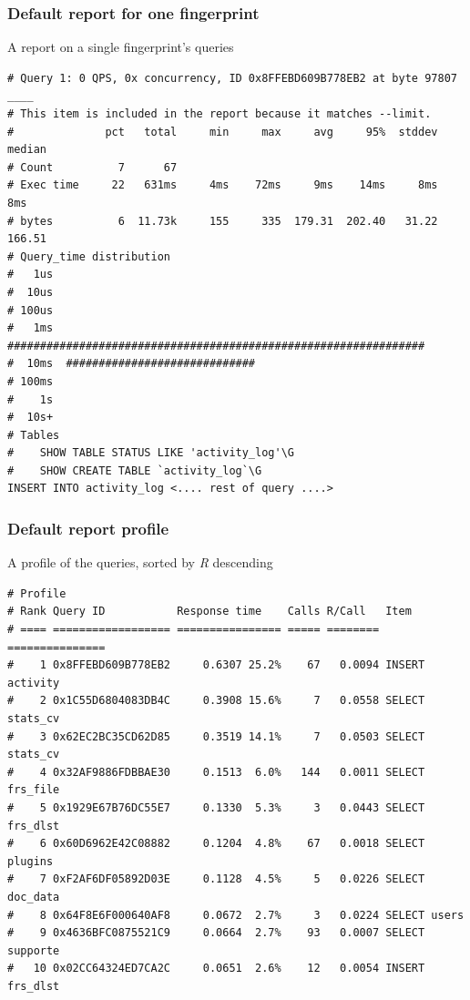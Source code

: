 \begin{frame}[fragile]
\frametitle{Default report for one fingerprint}
\begin{block}{A report on a single fingerprint's queries}
\end{block}
\scriptsize
\begin{verbatim}
# Query 1: 0 QPS, 0x concurrency, ID 0x8FFEBD609B778EB2 at byte 97807 ____
# This item is included in the report because it matches --limit.
#              pct   total     min     max     avg     95%  stddev  median
# Count          7      67
# Exec time     22   631ms     4ms    72ms     9ms    14ms     8ms     8ms
# bytes          6  11.73k     155     335  179.31  202.40   31.22  166.51
# Query_time distribution
#   1us
#  10us
# 100us
#   1ms  ################################################################
#  10ms  #############################
# 100ms
#    1s
#  10s+
# Tables
#    SHOW TABLE STATUS LIKE 'activity_log'\G
#    SHOW CREATE TABLE `activity_log`\G
INSERT INTO activity_log <.... rest of query ....>
\end{verbatim}
\normalsize
\end{frame}

\begin{frame}[fragile]
\frametitle{Default report profile}
\begin{block}{A profile of the queries, sorted by \emph{R} descending}
\end{block}
\scriptsize
\begin{verbatim}
# Profile
# Rank Query ID           Response time    Calls R/Call   Item
# ==== ================== ================ ===== ======== ===============
#    1 0x8FFEBD609B778EB2     0.6307 25.2%    67   0.0094 INSERT activity
#    2 0x1C55D6804083DB4C     0.3908 15.6%     7   0.0558 SELECT stats_cv
#    3 0x62EC2BC35CD62D85     0.3519 14.1%     7   0.0503 SELECT stats_cv
#    4 0x32AF9886FDBBAE30     0.1513  6.0%   144   0.0011 SELECT frs_file
#    5 0x1929E67B76DC55E7     0.1330  5.3%     3   0.0443 SELECT frs_dlst
#    6 0x60D6962E42C08882     0.1204  4.8%    67   0.0018 SELECT plugins
#    7 0xF2AF6DF05892D03E     0.1128  4.5%     5   0.0226 SELECT doc_data
#    8 0x64F8E6F000640AF8     0.0672  2.7%     3   0.0224 SELECT users
#    9 0x4636BFC0875521C9     0.0664  2.7%    93   0.0007 SELECT supporte
#   10 0x02CC64324ED7CA2C     0.0651  2.6%    12   0.0054 INSERT frs_dlst
\end{verbatim}
\normalsize
\end{frame}

